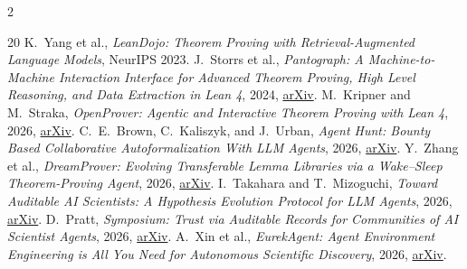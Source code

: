 \documentclass[10pt]{article}
\begin{document}
{\begin{multicols}{2}
\begin{thebibliography}{20}
 K.~Yang et al., \emph{LeanDojo: Theorem Proving with
Retrieval-Augmented Language Models}, NeurIPS 2023.
 J.~Storrs et al., \emph{Pantograph: A Machine-to-Machine
Interaction Interface for Advanced Theorem Proving, High Level Reasoning, and
Data Extraction in Lean 4}, 2024,
\href{https://doi.org/10.48550/arXiv.2410.16429}{arXiv}.
 M.~Kripner and M.~Straka, \emph{OpenProver: Agentic and
Interactive Theorem Proving with Lean 4}, 2026,
\href{https://doi.org/10.48550/arXiv.2607.09217}{arXiv}.
 C.~E.~Brown, C.~Kaliszyk, and J.~Urban, \emph{Agent Hunt:
Bounty Based Collaborative Autoformalization With LLM Agents}, 2026,
\href{https://doi.org/10.48550/arXiv.2603.06737}{arXiv}.
 Y.~Zhang et al., \emph{DreamProver: Evolving
Transferable Lemma Libraries via a Wake--Sleep Theorem-Proving Agent}, 2026,
\href{https://doi.org/10.48550/arXiv.2604.26311}{arXiv}.
 I.~Takahara and T.~Mizoguchi, \emph{Toward Auditable AI
Scientists: A Hypothesis Evolution Protocol for LLM Agents}, 2026,
\href{https://doi.org/10.48550/arXiv.2607.09195}{arXiv}.
 D.~Pratt, \emph{Symposium: Trust via Auditable Records for
Communities of AI Scientist Agents}, 2026,
\href{https://doi.org/10.48550/arXiv.2608.19511}{arXiv}.
 A.~Xin et al., \emph{EurekAgent: Agent Environment
Engineering is All You Need for Autonomous Scientific Discovery}, 2026,
\href{https://doi.org/10.48550/arXiv.2606.13662}{arXiv}.
\end{thebibliography}
\end{multicols}
}
\end{document}
